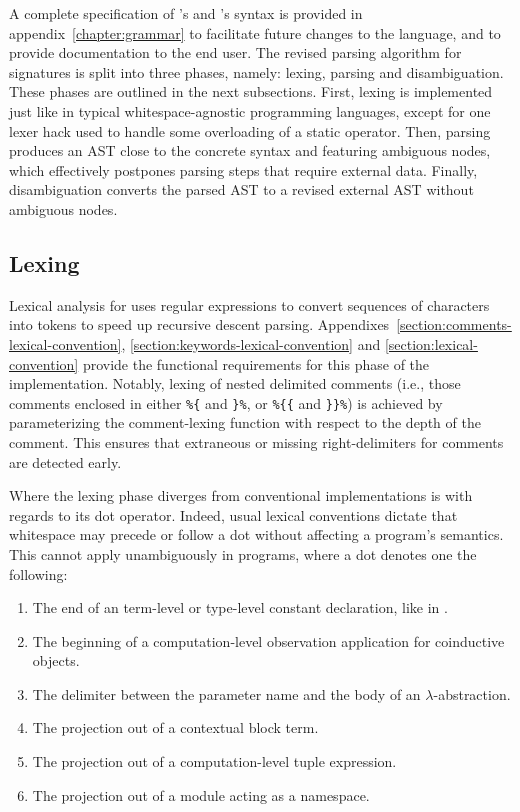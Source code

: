 A complete specification of \Beluga's and \Harpoon's syntax is provided in appendix~\ref{chapter:grammar} to facilitate future changes to the language, and to provide documentation to the end user.
The revised parsing algorithm for \Beluga signatures is split into three phases, namely: lexing, parsing and disambiguation.
These phases are outlined in the next subsections.
First, lexing is implemented just like in typical whitespace-agnostic programming languages, except for one lexer hack used to handle some overloading of a static operator.
Then, parsing produces an \ac{AST} close to the concrete syntax and featuring ambiguous nodes, which effectively postpones parsing steps that require external data.
Finally, disambiguation converts the parsed \ac{AST} to a revised external \ac{AST} without ambiguous nodes.

\subsection{Lexing}

Lexical analysis for \Beluga uses regular expressions to convert sequences of characters into tokens to speed up recursive descent parsing.
Appendixes~\ref{section:comments-lexical-convention}, \ref{section:keywords-lexical-convention} and \ref{section:lexical-convention} provide the functional requirements for this phase of the implementation.
Notably, lexing of nested delimited comments (i.e., those comments enclosed in either \verb|%{| and \verb|}%|, or \verb|%{{| and \verb|}}%|) is achieved by parameterizing the comment-lexing function with respect to the depth of the comment.
This ensures that extraneous or missing right-delimiters for comments are detected early.

Where the lexing phase diverges from conventional implementations is with regards to its dot operator.
Indeed, usual lexical conventions dictate that whitespace may precede or follow a dot without affecting a program's semantics.
This cannot apply unambiguously in \Beluga programs, where a dot denotes one the following:
\begin{enumerate}
\item
The end of an \LF term-level or type-level constant declaration, like in \Twelf.
\item
The beginning of a computation-level observation application for coinductive objects.
\item
The delimiter between the parameter name and the body of an \LF $\lambda$-abstraction.
\item
The projection out of a contextual \LF block term.
\item
The projection out of a computation-level tuple expression.
\item
The projection out of a module acting as a namespace.
\end{enumerate}

